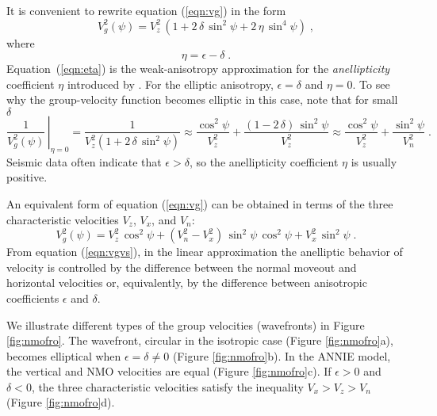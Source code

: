 
\par
It is convenient to rewrite equation (\ref{eqn:vg}) in the form 
\begin{equation}
V_g^2(\psi) = V_z^2\,\left(1 + 2\,\delta\,\sin^2{\psi} + 
2\,\eta\,\sin^4{\psi}\right)\;,
\label{eqn:vgeta}
\end{equation}
where 
\begin{equation}
   \eta = \epsilon - \delta \;.
\label{eqn:eta}
\end{equation}
Equation~(\ref{eqn:eta}) is the weak-anisotropy approximation for the
{\em anellipticity}$\,$ coefficient $\eta$ introduced by
\cite{aktsvan}. For the elliptic anisotropy, $\epsilon = \delta$ and
$\eta = 0$. To see why the group-velocity function becomes elliptic in
this case, note that for small $\delta$
\begin{equation}
\left. \frac{1}{V_g^2(\psi)} \, \right|_{\eta=0} = 
       \frac{1}{V_z^2\left(1 + 2\,\delta\,\sin^2{\psi} \right) } 
\approx 
\frac{\cos^2{\psi}}{V_z^2} + \frac{(1 - 2\,\delta)\,\sin^2{\psi}}{V_z^2}
\approx
\frac{\cos^2{\psi}}{V_z^2} + \frac{\sin^2{\psi}}{V_n^2} \;.
\label{eqn:vgeta1}
\end{equation}
Seismic data often indicate that $\epsilon > \delta$, so the anellipticity
coefficient $\eta$ is usually positive.

\par
An equivalent form of equation (\ref{eqn:vg}) can be obtained in terms of
the three characteristic velocities $V_z$, $V_x$, and $V_n$:
\begin{equation}
V_g^2(\psi) = V_z^2\,\cos^2{\psi} + 
\left(V_n^2 - V_x^2\right)\,\sin^2{\psi}\,\cos^2{\psi} + 
V_x^2\,\sin^2{\psi}\;.
\label{eqn:vgvs}
\end{equation}
From equation (\ref{eqn:vgvs}), in the linear
approximation the anelliptic behavior of velocity is controlled by
the difference between the normal moveout and horizontal velocities
or, equivalently, by the difference between anisotropic 
coefficients $\epsilon$ and $\delta$.
\par
We illustrate different types of the group velocities (wavefronts)
in Figure \ref{fig:nmofro}.
The wavefront, circular in the isotropic case (Figure
\ref{fig:nmofro}a), becomes elliptical when $\epsilon=\delta \neq 0$
(Figure \ref{fig:nmofro}b). In the ANNIE model, the vertical and NMO
velocities are equal (Figure \ref{fig:nmofro}c). If $\epsilon > 0$ and
$\delta < 0$, the three characteristic velocities satisfy the
inequality $V_x > V_z > V_n$ (Figure \ref{fig:nmofro}d).


